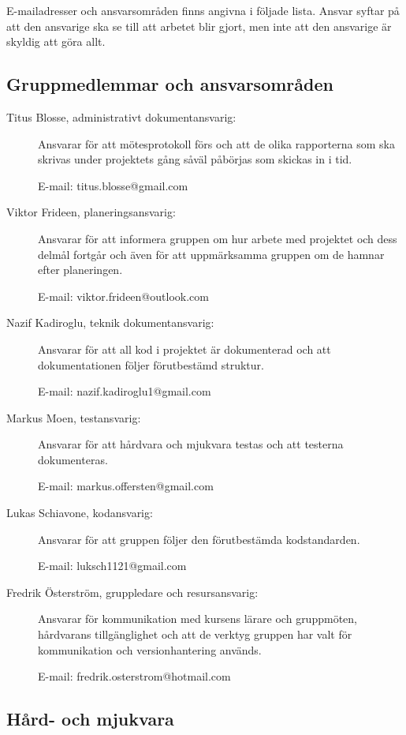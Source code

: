 \documentclass[a4paper]{article}
\begin{document}
E-mailadresser och ansvarsområden finns angivna i följade lista. Ansvar syftar på att den ansvarige ska se till att arbetet blir gjort, men inte att den ansvarige är skyldig att göra allt.

\subsection{Gruppmedlemmar och ansvarsområden}

\begin{description}
    \item[Titus Blosse, administrativt dokumentansvarig:] Ansvarar för att mötesprotokoll förs och att de olika rapporterna som ska skrivas under projektets gång såväl påbörjas som skickas in i tid.

    E-mail: titus.blosse@gmail.com

    \item[Viktor Frideen, planeringsansvarig:] Ansvarar för att informera gruppen om hur arbete med projektet och dess delmål fortgår och även för att uppmärksamma gruppen om de hamnar efter planeringen.

    E-mail: viktor.frideen@outlook.com

    \item[Nazif Kadiroglu, teknik dokumentansvarig:] Ansvarar för att all kod i projektet är dokumenterad och att dokumentationen följer förutbestämd struktur. 

    E-mail: nazif.kadiroglu1@gmail.com

    \item[Markus Moen, testansvarig:] Ansvarar för att hårdvara och mjukvara testas och att testerna dokumenteras.

    E-mail: markus.offersten@gmail.com

    \item[Lukas Schiavone, kodansvarig:] Ansvarar för att gruppen följer den förutbestämda kodstandarden.

    E-mail: luksch1121@gmail.com

    \item[Fredrik Österström, gruppledare och resursansvarig:] Ansvarar för kommunikation med kursens lärare och gruppmöten, hårdvarans tillgänglighet och att de verktyg gruppen har valt för kommunikation och versionhantering används.

    E-mail: fredrik.osterstrom@hotmail.com
\end{description}

\subsection{Hård- och mjukvara}
\end{document}
